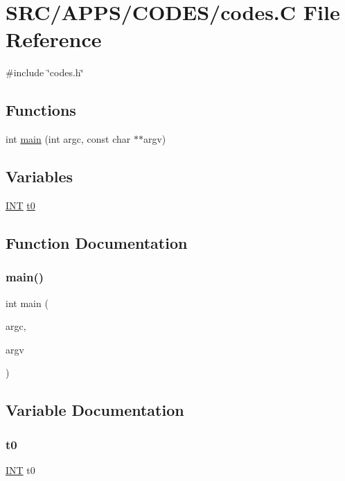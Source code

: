 \hypertarget{codes_8_c}{}\section{S\+R\+C/\+A\+P\+P\+S/\+C\+O\+D\+E\+S/codes.C File Reference}
\label{codes_8_c}
{\ttfamily \#include \char`\"{}codes.\+h\char`\"{}}\newline
\subsection*{Functions}
\begin{DoxyCompactItemize}
\item 
int \mbox{\hyperlink{codes_8_c_a217dbf8b442f20279ea00b898af96f52}{main}} (int argc, const char $\ast$$\ast$argv)
\end{DoxyCompactItemize}
\subsection*{Variables}
\begin{DoxyCompactItemize}
\item 
\mbox{\hyperlink{galois_8h_a09fddde158a3a20bd2dcadb609de11dc}{I\+NT}} \mbox{\hyperlink{codes_8_c_a4268f4fe222ffb119218a0199f5e1904}{t0}}
\end{DoxyCompactItemize}


\subsection{Function Documentation}
\mbox{\label{codes_8_c_a217dbf8b442f20279ea00b898af96f52}} 
\subsubsection{\texorpdfstring{main()}{main()}}
{\footnotesize\ttfamily int main (\begin{DoxyParamCaption}\item[{int}]{argc,  }\item[{const char $\ast$$\ast$}]{argv }\end{DoxyParamCaption})}



\subsection{Variable Documentation}
\mbox{\label{codes_8_c_a4268f4fe222ffb119218a0199f5e1904}} 
\subsubsection{\texorpdfstring{t0}{t0}}
{\footnotesize\ttfamily \mbox{\hyperlink{galois_8h_a09fddde158a3a20bd2dcadb609de11dc}{I\+NT}} t0}

